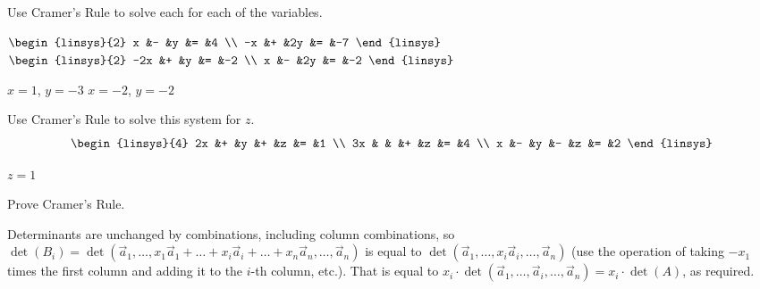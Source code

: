 \begin{exercises}
  \item 
    Use Cramer's Rule to solve each for each of the variables.
    \begin{exparts*}
      \partsitem $\begin{linsys}{2}
                    x  &- &y  &=  &4  \\
                   -x  &+ &2y &=  &-7
                  \end{linsys}$
      \partsitem $\begin{linsys}{2}
                    -2x  &+  &y  &=  &-2 \\
                      x  &-  &2y &=  &-2  
                  \end{linsys}$
    \end{exparts*}
    \begin{answer}
      \begin{exparts*}
        \partsitem $x=1$, $y=-3$
        \partsitem $x=-2$, $y=-2$
      \end{exparts*} 
    \end{answer}
  \item 
    Use Cramer's Rule to solve this system for \( z \).
    \begin{equation*}
      \begin{linsys}{4}
        2x  &+  &y  &+  &z  &=  &1 \\
        3x  &   &   &+  &z  &=  &4 \\
         x  &-  &y  &-  &z  &=  &2
      \end{linsys}
    \end{equation*}
    \begin{answer}
      \( z=1 \)
    \end{answer}
  \item \label{ex:CramerRule}
    Prove Cramer's Rule.
    \begin{answer}
      Determinants are unchanged by combinations, 
      including column combinations, so
      \( \det(B_i)=\det(\vec{a}_1,\dots,
      x_1\vec{a}_1+\dots+x_i\vec{a}_i+\dots+x_n\vec{a}_n,\dots,\vec{a}_n) \)
      is equal to 
      $\det(\vec{a}_1,\dots,x_i\vec{a}_i,\dots,\vec{a}_n)$
      (use the operation of taking $-x_1$ times the first column and adding 
      it to the $i$-th column, etc.).  
      That is equal to 
      $x_i\cdot\det(\vec{a}_1,\dots,\vec{a}_i,\dots,\vec{a}_n)
         =x_i\cdot\det(A)$,
      as required.
    \end{answer}
  \item 

\end{exercises}

